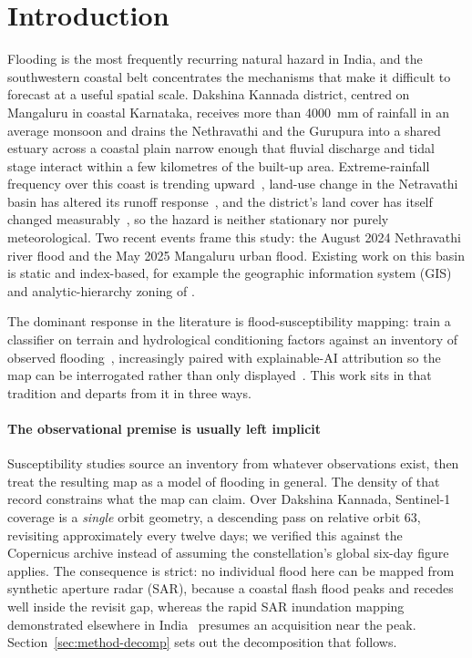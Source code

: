 \documentclass[10pt,twocolumn]{article}
\begin{document}




\section{Introduction}
\label{sec:intro}

Flooding is the most frequently recurring natural hazard in India, and the
southwestern coastal belt concentrates the mechanisms that make it difficult to
forecast at a useful spatial scale. Dakshina Kannada district, centred on
Mangaluru in coastal Karnataka, receives more than \SI{4000}{\milli\metre} of
rainfall in an average monsoon and drains the Nethravathi and the Gurupura into a
shared estuary across a coastal plain narrow enough that fluvial discharge and
tidal stage interact within a few kilometres of the built-up area.
Extreme-rainfall frequency over this coast is trending
upward~\citep{chandrashekar2018}, land-use change in the Netravathi basin has
altered its runoff response~\citep{chandana2023,babar2015}, and the district's
land cover has itself changed measurably~\citep{naik2022}, so the hazard is
neither stationary nor purely meteorological. Two recent events frame this study:
the August 2024 Nethravathi river flood and the May 2025 Mangaluru urban flood.
Existing work on this basin is static and index-based, for example the geographic information system (GIS) and analytic-hierarchy zoning of \citet{nirmala2026}.

The dominant response in the literature is flood-susceptibility mapping: train a
classifier on terrain and hydrological conditioning factors against an inventory
of observed flooding~\citep{tehrany2014,khosravi2018,arabameri2019,saha2021},
increasingly paired with explainable-AI attribution so the map can be
interrogated rather than only
displayed~\citep{lundberg2017,aydin2022,seydi2023}. This work sits in that
tradition and departs from it in three ways.

\paragraph{The observational premise is usually left implicit}
Susceptibility studies source an inventory from whatever observations exist, then
treat the resulting map as a model of flooding in general. The density of that
record constrains what the map can claim. Over Dakshina Kannada,
Sentinel-1~\citep{torres2012} coverage is a \emph{single} orbit geometry, a
descending pass on relative orbit 63, revisiting approximately every twelve days;
we verified this against the Copernicus archive instead of assuming the
constellation's global six-day figure applies. The consequence is strict: no
individual flood here can be mapped from synthetic aperture radar (SAR), because a coastal flash flood peaks
and recedes well inside the revisit gap, whereas the rapid SAR inundation mapping
demonstrated elsewhere in India~\citep{arora2023} presumes an acquisition near
the peak. Section~\ref{sec:method-decomp} sets out the decomposition that
follows.
\end{document}
